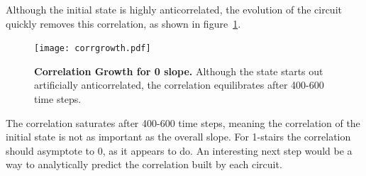 Although the initial state is highly anticorrelated, the evolution of the circuit quickly removes this correlation, as shown in figure~\ref{fig:corrgrowth}.
\begin{figure}
	\centering
	\texttt{[image: corrgrowth.pdf]}
	\caption{\textbf{Correlation Growth for 0 slope.} Although the state starts out artificially anticorrelated, the correlation equilibrates after 400-600 time steps.}
	\label{fig:corrgrowth}
\end{figure}
The correlation saturates after 400-600 time steps, meaning the correlation of the initial state is not as important as the overall slope. For 1-stairs the correlation should asymptote to 0, as it appears to do. An interesting next step would be a way to analytically predict the correlation built by each circuit.